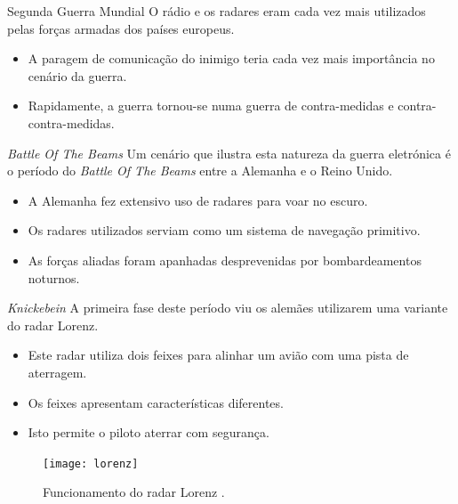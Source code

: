 \documentclass[portuguese,10pt]{beamer}
\begin{document}

\begin{frame}{Segunda Guerra Mundial}
    O rádio e os radares eram cada vez mais utilizados pelas forças armadas dos países europeus.
    \begin{itemize}
        \item A paragem de comunicação do inimigo teria cada vez mais importância no cenário da guerra.
        \item Rapidamente, a guerra tornou-se numa guerra de contra-medidas e contra-contra-medidas.
    \end{itemize}
\end{frame}

\begin{frame}{\textit{Battle Of The Beams}}
    Um cenário que ilustra esta natureza da guerra eletrónica é o período do \textit{Battle Of The Beams} entre a Alemanha e o Reino Unido.
    \begin{itemize}
        \item A Alemanha fez extensivo uso de radares para voar no escuro.
        \item Os radares utilizados serviam como um sistema de navegação primitivo.
        \item As forças aliadas foram apanhadas desprevenidas por bombardeamentos noturnos.
    \end{itemize}
\end{frame}

\begin{frame}{\textit{Knickebein}}
    A primeira fase deste período viu os alemães utilizarem uma variante do radar Lorenz.
    \begin{itemize}
        \item<1-> Este radar utiliza dois feixes para alinhar um avião com uma pista de aterragem.
        \item<2-> Os feixes apresentam características diferentes.
        \item<3-> Isto permite o piloto aterrar com segurança.
    \end{itemize}
    \begin{figure}
        \centering
        \texttt{[image: lorenz]}
        \caption{Funcionamento do radar Lorenz \cite{pentagonknickebein}.}
        \label{fig:radarlisboa}
    \end{figure}
\end{frame}
\end{document}
